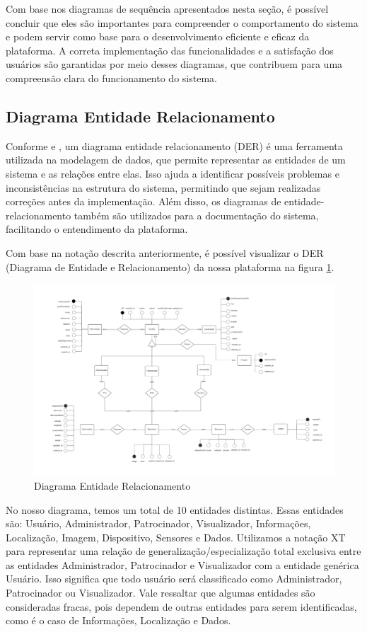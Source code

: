 \documentclass[tcc,capa]{texufpel}
\begin{document}
Com base nos diagramas de sequência apresentados nesta seção, é possível concluir que eles são importantes para compreender o comportamento do sistema e podem servir como base para o desenvolvimento eficiente e eficaz da plataforma. A correta implementação das funcionalidades e a satisfação dos usuários são garantidas por meio desses diagramas, que contribuem para uma compreensão clara do funcionamento do sistema.


\subsection{Diagrama Entidade Relacionamento}
\label{sec:entidaderelacionameto}
Conforme \citet{ELMASRI:2010} e  \citet{Silberschatz:2010}, um diagrama entidade relacionamento (DER) é uma ferramenta utilizada na modelagem de dados, que permite representar as entidades de um sistema e as relações entre elas. Isso ajuda a identificar possíveis problemas e inconsistências na estrutura do sistema, permitindo que sejam realizadas correções antes da implementação. Além disso, os diagramas de entidade-relacionamento também são utilizados para a documentação do sistema, facilitando o entendimento da plataforma.

Com base na notação descrita anteriormente, é possível visualizar o DER (Diagrama de Entidade e Relacionamento) da nossa plataforma na figura \ref{der}.

\begin{figure}[htbp]
  \centering \includegraphics[scale=.275]{assets/DiagramaER.png}
  \caption{Diagrama Entidade Relacionamento}
  \label{der}
\end{figure}


No nosso diagrama, temos um total de 10 entidades distintas. Essas entidades são: Usuário, Administrador, Patrocinador, Visualizador, Informações, Localização, Imagem, Dispositivo, Sensores e Dados. Utilizamos a notação XT para representar uma relação de generalização/especialização total exclusiva entre as entidades Administrador, Patrocinador e Visualizador com a entidade genérica Usuário. Isso significa que todo usuário será classificado como Administrador, Patrocinador ou Visualizador. Vale ressaltar que algumas entidades são consideradas fracas, pois dependem de outras entidades para serem identificadas, como é o caso de Informações, Localização e Dados.
\end{document}
